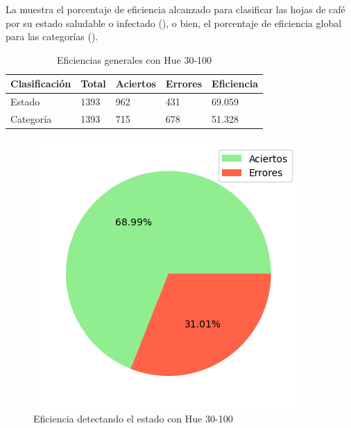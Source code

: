 La  muestra el porcentaje de eficiencia alcanzado para clasificar las hojas de café por su estado saludable o infectado (), o bien, el porcentaje de eficiencia global para las categorías ().

\begin{table}[h!]
\centering
\begin{tabular}{|l|l|l|l|l|}
\hline 
\textbf{Clasificación} & \textbf{Total} & \textbf{Aciertos} & \textbf{Errores} & \textbf{Eficiencia} \\
\hline
Estado & 1393 & 962 & 431 & 69.059 \\
\hline 
Categoría & 1393 & 715 & 678 & 51.328 \\
\hline 
\end{tabular}
\caption{Eficiencias generales con Hue 30-100}
\label{table:efficiency_general_30_100}
\end{table}

\captionsetup[figure]{skip=-10pt}

\begin{figure}[H]
\centering
\includegraphics[scale=0.6]{images/result_global_state_30_100.png}
\caption{Eficiencia detectando el estado con Hue 30-100}
\label{img:efficiency_state_30_100}
\end{figure}

